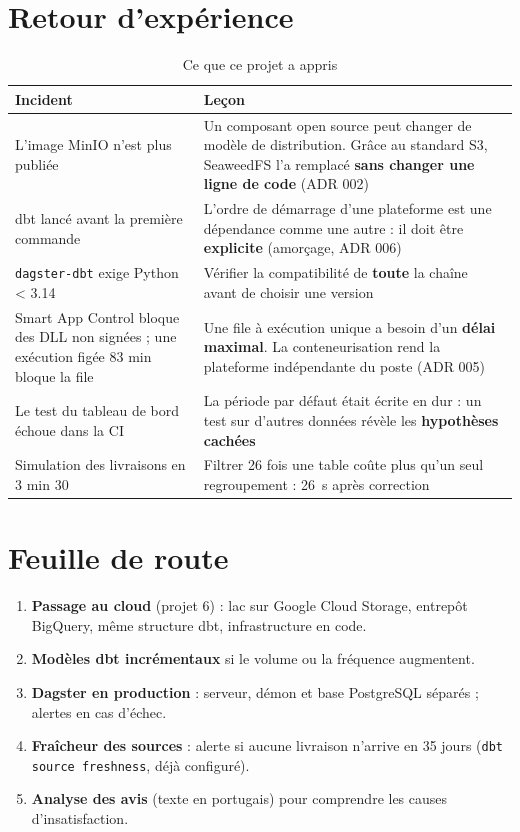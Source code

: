\documentclass[11pt, a4paper, oneside, headings=normal, numbers=noenddot, DIV=12]{scrartcl}
\begin{document}
\section{Retour d'expérience}
\begin{table}[H]
\centering\small
\begin{tabularx}{\linewidth}{@{}L{3.9cm} Y@{}}
\toprule
\textbf{Incident} & \textbf{Leçon} \\
\midrule
L'image MinIO n'est plus publiée & Un composant open source peut changer de modèle de distribution. Grâce au standard S3, SeaweedFS l'a remplacé \textbf{sans changer une ligne de code} (ADR 002) \\
dbt lancé avant la première commande & L'ordre de démarrage d'une plateforme est une dépendance comme une autre : il doit être \textbf{explicite} (amorçage, ADR 006) \\
\texttt{dagster-dbt} exige Python < 3.14 & Vérifier la compatibilité de \textbf{toute} la chaîne avant de choisir une version \\
Smart App Control bloque des DLL non signées ; une exécution figée 83 min bloque la file & Une file à exécution unique a besoin d'un \textbf{délai maximal}. La conteneurisation rend la plateforme indépendante du poste (ADR 005) \\
Le test du tableau de bord échoue dans la CI & La période par défaut était écrite en dur : un test sur d'autres données révèle les \textbf{hypothèses cachées} \\
Simulation des livraisons en 3 min 30 & Filtrer 26 fois une table coûte plus qu'un seul regroupement : 26~s après correction \\
\bottomrule
\end{tabularx}
\caption{Ce que ce projet a appris}
\end{table}

\section{Feuille de route}
\begin{enumerate}[leftmargin=1.4em]
  \item \textbf{Passage au cloud} (projet 6) : lac sur Google Cloud Storage, entrepôt BigQuery, même structure dbt, infrastructure en code.
  \item \textbf{Modèles dbt incrémentaux} si le volume ou la fréquence augmentent.
  \item \textbf{Dagster en production} : serveur, démon et base PostgreSQL séparés ; alertes en cas d'échec.
  \item \textbf{Fraîcheur des sources} : alerte si aucune livraison n'arrive en 35 jours (\texttt{dbt source freshness}, déjà configuré).
  \item \textbf{Analyse des avis} (texte en portugais) pour comprendre les causes d'insatisfaction.
\end{enumerate}
\end{document}

